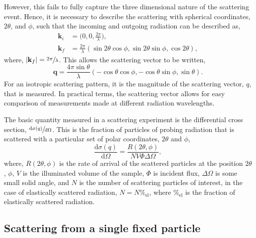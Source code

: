 %
However, this fails to fully capture the three dimensional nature of the scattering event.
Hence, it is necessary to describe the scattering with spherical coordinates, $2\theta$, and $\phi$, such that the incoming and outgoing radiation can be described as,
%
\begin{equation}
    \begin{aligned}
        \mathbf{k}_i & = \bigg(0, 0, \frac{2\pi}{\lambda}\bigg), \\
        \mathbf{k}_f & = \frac{2\pi}{\lambda}(\sin{2\theta}\cos{\phi}, \sin{2\theta}\sin{\phi}, \cos{2\theta}),
    \end{aligned}
\end{equation}
%
where, $|\mathbf{k}_f| = \sfrac{2\pi}{\lambda}$. This allows the scattering vector to be written,
%
\begin{equation}
    \mathbf{q} = \frac{4\pi\sin{\theta}}{\lambda}(-\cos{\theta}\cos{\phi}, -\cos{\theta}\sin{\phi},\sin{\theta}).
\end{equation}
%
For an isotropic scattering pattern, it is the magnitude of the scattering vector, $q$, that is measured.
In practical terms, the scattering vector allows for easy comparison of measurements made at different radiation wavelengths.

The basic quantity measured in a scattering experiment is the differential cross section, $\sfrac{\text{d}\sigma(q)}{\text{d}\Omega}$.
This is the fraction of particles of probing radiation that is scattered with a particular set of polar coordinates, $2\theta$ and $\phi$,
%
\begin{equation}
    \frac{\text{d}\sigma(q)}{\text{d}\Omega} = \frac{R(2\theta,\phi)}{NV\Phi\Delta \Omega},
    \label{equ:dsc}
\end{equation}
%
where, $R(2\theta,\phi)$ is the rate of arrival of the scattered particles at the position $2\theta$, $\phi$, $V$ is the illuminated volume of the sample, $\Phi$ is incident flux, $\Delta \Omega$ is some small solid angle, and $N$ is the number of scattering particles of interest, in the case of elastically scattered radiation, $N = N\%_{\text{el}}$, where $\%_{\text{el}}$ is the fraction of elastically scattered radiation.

\subsection{Scattering from a single fixed particle}

